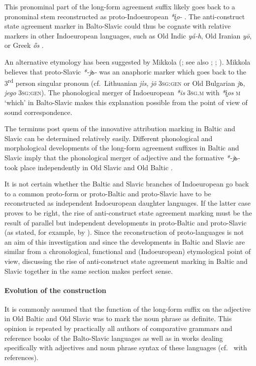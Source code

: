 This pronominal part of the long-form agreement suffix likely goes back to a pronominal stem reconstructed as proto-Indoeuropean \textit{*i̭o-} \citep[61]{wissemann1958}. The anti-construct state agreement marker in Balto-Slavic could thus be cognate with relative markers in other Indoeuropean languages, such as Old Indic \textit{yá-h}, Old Iranian \textit{yō}, or Greek \textit{ős} \cite[53]{heinrichs1954}.

An alternative etymology has been suggested by Mikkola (\citeyear[52]{mikkola1950}; %
 see also \citealt[102]{leskien1871}; \citealt[164–165]{leskien1919}; \citealt[19ff.]{wijk1935}). Mikkola believes that proto-Slavic \textit{*-jь-} was an anaphoric marker which goes back to the 3\textsuperscript{rd} person singular pronoun (cf.~Lithuanian \textit{jìs}, \textit{jõ} \textsc{3sg:gen} or Old Bulgarian \textit{jъ}, \textit{jego} \textsc{3sg:gen}). The phonological merger of Indoeuropean \textit{*is} \textsc{3sg.m} with \textit{\textit{*i̭os}} \textsc{m} ‘which’ in Balto-Slavic \cite[21 Footnote 8]{schmidt1959} makes this explanation possible from the point of view of sound correspondence.

The terminus post quem of the innovative attribution marking in Baltic and Slavic can be determined relatively easily. Different phonological and morphological developments of the long-form agreement suffixes in Baltic and Slavic imply that the phonological merger of adjective and the formative \textit{*-jь-} took place independently in Old Slavic and Old Baltic \citep[64–65]{koch1992}. 

It is not certain whether the Baltic and Slavic branches of Indoeuropean go back to a common proto-form or proto-Baltic and proto-Slavic have to be reconstructed as independent Indoeuropean daughter languages. If the latter case proves to be right, the rise of anti-construct state agreement marking must be the result of parallel but independent developments in proto-Baltic and proto-Slavic (as stated, for example, by \citealt[77]{pohl1980}). Since the reconstruction of proto-languages is not an aim of this investigation and since the developments in Baltic and Slavic are similar from a chronological, functional and (Indoeuropean) etymological point of view, discussing the rise of anti-construct state agreement marking in Baltic and Slavic together in the same section makes perfect sense.

\paragraph{Evolution of the construction} 
It is commonly assumed that the function of the long-form suffix on the adjective in Old Baltic and Old Slavic was to mark the noun phrase as definite. This opinion is repeated by practically all authors of comparative grammars and reference books of the Balto-Slavic languages as well as in works dealing specifically with adjectives and noun phrase syntax of these languages (cf.~\citealt[211]{mendoza2004} with references).

